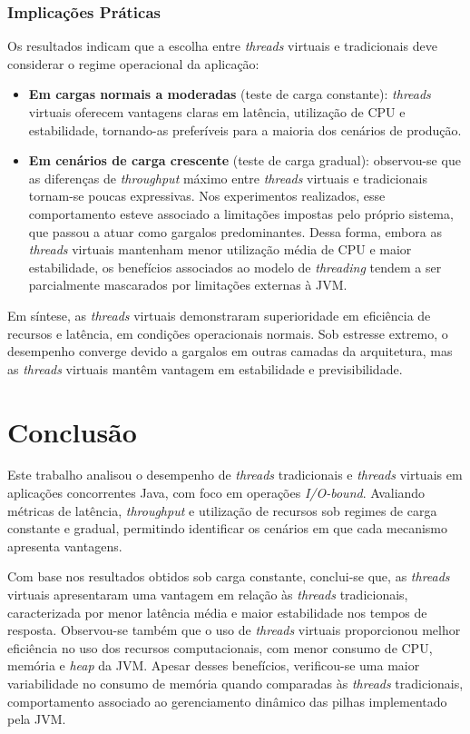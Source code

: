 \documentclass[12pt, openright, oneside, a4paper, english,	french,	spanish, brazil	]{abntex2}
\begin{document}
\subsection{Implicações Práticas}
\label{subsec:implicacoes}

Os resultados indicam que a escolha entre \textit{threads} virtuais e tradicionais deve considerar o regime operacional da aplicação:

\begin{itemize}
    \item \textbf{Em cargas normais a moderadas} (teste de carga constante): \textit{threads} virtuais oferecem vantagens claras em latência, utilização de CPU e estabilidade, tornando-as preferíveis para a maioria dos cenários de produção.
    
    \item \textbf{Em cenários de carga crescente} (teste de carga gradual): observou-se que as diferenças de \textit{throughput} máximo entre \textit{threads} virtuais e tradicionais tornam-se poucas expressivas. Nos experimentos realizados, esse comportamento esteve associado a limitações impostas pelo próprio sistema, que passou a atuar como gargalos predominantes. Dessa forma, embora as \textit{threads} virtuais mantenham menor utilização média de CPU e maior estabilidade, os benefícios associados ao modelo de \textit{threading} tendem a ser parcialmente mascarados por limitações externas à JVM.
\end{itemize}

Em síntese, as \textit{threads} virtuais demonstraram superioridade em eficiência de recursos e latência, em condições operacionais normais. Sob estresse extremo, o desempenho converge devido a gargalos em outras camadas da arquitetura, mas as \textit{threads} virtuais mantêm vantagem em estabilidade e previsibilidade.

\chapter{Conclusão}
\label{chapter:conclusao}

Este trabalho analisou o desempenho de \textit{threads} tradicionais e \textit{threads} virtuais em aplicações concorrentes Java, com foco em operações \textit{I/O-bound}. Avaliando métricas de latência, \textit{throughput} e utilização de recursos sob regimes de carga constante e gradual, permitindo identificar os cenários em que cada mecanismo apresenta vantagens.

Com base nos resultados obtidos sob carga constante, conclui-se que, as \textit{threads} virtuais apresentaram uma vantagem em relação às \textit{threads} tradicionais, caracterizada por menor latência média e maior estabilidade nos tempos de resposta. Observou-se também que o uso de \textit{threads} virtuais proporcionou melhor eficiência no uso dos recursos computacionais, com menor consumo de CPU, memória e \textit{heap} da JVM. Apesar desses benefícios, verificou-se uma maior variabilidade no consumo de memória quando comparadas às \textit{threads} tradicionais, comportamento associado ao gerenciamento dinâmico das pilhas implementado pela JVM.
\end{document}
